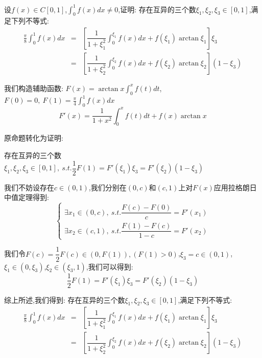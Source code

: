 
\begin{proposition}
	设$f(x)\in C[0,1]$,$\int_{0}^{1}f(x)dx\neq 0$,证明: 存在互异的三个数$\xi_{1},\xi_{2},\xi_{3}\in[0,1]$,满足下列不等式:
	\begin{eqnarray*}
		\frac{\pi}{8}\int_{0}^{1}f(x)dx&=&\left[\dfrac{1}{1+\xi_{1}^2}\int_{0}^{\xi_{1}}f(x)dx+f(\xi_{1})\arctan\xi_{1}\right]\xi_{3}\\
		&=&\left[\dfrac{1}{1+\xi_{2}^2}\int_{0}^{\xi_{2}}f(x)dx+f(\xi_{2})\arctan\xi_{2}\right](1-\xi_{3})
	\end{eqnarray*}
\end{proposition}
\begin{solution}

	我们构造辅助函数: $F(x)=\arctan x\int_{0}^{x}f(t)dt$,\ $F(0)=0,\ F(1)=\frac{\pi}{4}\int_{0}^{1}f(x)dx$
	$$F'(x)=\dfrac{1}{1+x^2}\int_{0}^{x}f(t)dt+f(x)\arctan x$$

	原命题转化为证明:

	存在互异的三个数 $\xi_{1},\xi_{2},\xi_{3}\in[0,1],\ s.t. \dfrac{1}{2}F(1)=F'(\xi_{1})\xi_{3}=F'(\xi_{2})(1-\xi_{3})$

	我们不妨设存在$c\in(0,1)$,我们分别在$(0,c)$和$(c,1)$上对$F(x)$应用拉格朗日中值定理得到:
	$$\left\lbrace
		\begin{array}{l}
			\exists x_{1}\in(0,c),\ s.t. \dfrac{F(c)-F(0)}{c}=F'(x_{1}) \\
			\exists x_{2}\in(c,1),\ s.t. \dfrac{F(1)-F(c)}{1-c}=F'(x_{2})
		\end{array}
		\right. $$

	我们令$F(c)=\dfrac{1}{2}F(c)\in(0,F(1)),(F(1)>0)$,$\xi_{3}=c\in(0,1)$,$\xi_{1}\in(0,\xi_{3})$,$\xi_{2}\in(\xi_{3},1)$,我们可以得到:
	$$\dfrac{1}{2}F(1)=F'(\xi_{1})\xi_{3}=F'(\xi_{2})(1-\xi_{3})$$

	综上所述,我们得到: 存在互异的三个数$\xi_{1},\xi_{2},\xi_{3}\in[0,1]$,满足下列不等式:
	\begin{eqnarray*}
		\frac{\pi}{8}\int_{0}^{1}f(x)dx&=&\left[\dfrac{1}{1+\xi_{1}^2}\int_{0}^{\xi_{1}}f(x)dx+f(\xi_{1})\arctan\xi_{1}\right]\xi_{3}\\
		&=&\left[\dfrac{1}{1+\xi_{2}^2}\int_{0}^{\xi_{2}}f(x)dx+f(\xi_{2})\arctan\xi_{2}\right](1-\xi_{3})
	\end{eqnarray*}
\end{solution}


